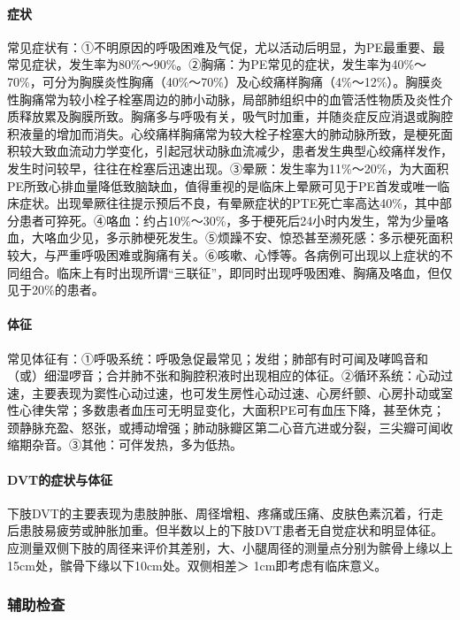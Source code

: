 \paragraph{症状}

常见症状有：①不明原因的呼吸困难及气促，尤以活动后明显，为PE最重要、最常见症状，发生率为80\%～90\%。②胸痛：为PE常见的症状，发生率为40\%～70\%，可分为胸膜炎性胸痛（40\%～70\%）及心绞痛样胸痛（4\%～12\%）。胸膜炎性胸痛常为较小栓子栓塞周边的肺小动脉，局部肺组织中的血管活性物质及炎性介质释放累及胸膜所致。胸痛多与呼吸有关，吸气时加重，并随炎症反应消退或胸腔积液量的增加而消失。心绞痛样胸痛常为较大栓子栓塞大的肺动脉所致，是梗死面积较大致血流动力学变化，引起冠状动脉血流减少，患者发生典型心绞痛样发作，发生时问较早，往往在栓塞后迅速出现。③晕厥：发生率为11\%～20\%，为大面积PE所致心排血量降低致脑缺血，值得重视的是临床上晕厥可见于PE首发或唯一临床症状。出现晕厥往往提示预后不良，有晕厥症状的PTE死亡率高达40\%，其中部分患者可猝死。④咯血：约占10\%～30\%，多于梗死后24小时内发生，常为少量咯血，大咯血少见，多示肺梗死发生。⑤烦躁不安、惊恐甚至濒死感：多示梗死面积较大，与严重呼吸困难或胸痛有关。⑥咳嗽、心悸等。各病例可出现以上症状的不同组合。临床上有时出现所谓“三联征”，即同时出现呼吸困难、胸痛及咯血，但仅见于20\%的患者。

\paragraph{体征}

常见体征有：①呼吸系统：呼吸急促最常见；发绀；肺部有时可闻及哮鸣音和（或）细湿啰音；合并肺不张和胸腔积液时出现相应的体征。②循环系统：心动过速，主要表现为窦性心动过速，也可发生房性心动过速、心房纤颤、心房扑动或室性心律失常；多数患者血压可无明显变化，大面积PE可有血压下降，甚至休克；颈静脉充盈、怒张，或搏动增强；肺动脉瓣区第二心音亢进或分裂，三尖瓣可闻收缩期杂音。③其他：可伴发热，多为低热。

\paragraph{DVT的症状与体征}

下肢DVT的主要表现为患肢肿胀、周径增粗、疼痛或压痛、皮肤色素沉着，行走后患肢易疲劳或肿胀加重。但半数以上的下肢DVT患者无自觉症状和明显体征。应测量双侧下肢的周径来评价其差别，大、小腿周径的测量点分别为髌骨上缘以上15cm处，髌骨下缘以下10cm处。双侧相差＞
1cm即考虑有临床意义。

\subsubsection{辅助检查}

